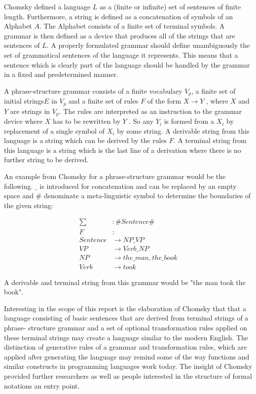 \documentclass{article}
\begin{document}
Chomsky defined a language $L$ as a (finite or infinite) set of sentences of finite length. Furthermore, a string is defined as a concatenation of symbols of an Alphabet $A$. The Alphabet consists of a finite set of terminal symbols. A grammar is then defined as a device that produces all of the strings that are sentences of $L$. A properly formulated grammar should define unambiguously the set of grammatical sentences of the language it represents. This means that a sentence which is clearly part of the language should be handled by the grammar in a fixed and predetermined manner.

A phrase-structure grammar consists of a finite vocabulary $V_p$, a finite set of initial strings$E$ in $V_p$ and a finite set of rules $F$ of the form $X \to Y$ , where $X$ and $Y$ are strings in $V_p$. The rules are interpreted as an instruction to the grammar device where $X$ has to be rewritten by $Y$ . So any $Y_i$ is formed from a $X_i$ by replacement of a single symbol of $X_i$ by some string. A derivable string from this language is a string which can be derived by the rules $F$. A terminal string from this language is a string which is the last line of a derivation where there is no further string to be derived.

An example from Chomsky for a phrase-structure grammar would be the following. $\_$ is introduced for concatenation and can be replaced by an empty space and \# denominate a meta-linguistic symbol to determine the boundaries of the given string:

\begin{equation} \label{eq1}
	\begin{split}
		\sum &: \# Sentence \# \\
		F&: \\ Sentence &\to NP\_VP \\
		VP &\to Verb\_NP \\
		NP &\to the\_man, the\_book \\
		Verb &\to took
	\end{split}
\end{equation}

A derivable and terminal string from this grammar would be "the man took the book".

Interesting in the scope of this report is the elaboration of Chomsky that that a language consisting of basic sentences that are derived from terminal strings of a phrase- structure grammar and a set of optional transformation rules applied on these terminal strings may create a language similar to the modern English. The distinction of generative rules of a grammar and transformation rules, which are applied after generating the language may remind some of the way functions and similar constructs in programming languages work today. The insight of Chomsky provided further researchers as well as people interested in the structure of formal notations an entry point.
\end{document}

